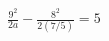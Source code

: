 \documentclass[border=2.5pt]{standalone}
\begin{document}
$\displaystyle \frac{9^2}{2a}-\frac{8^2}{2(7/5)}=5$
\end{document}
